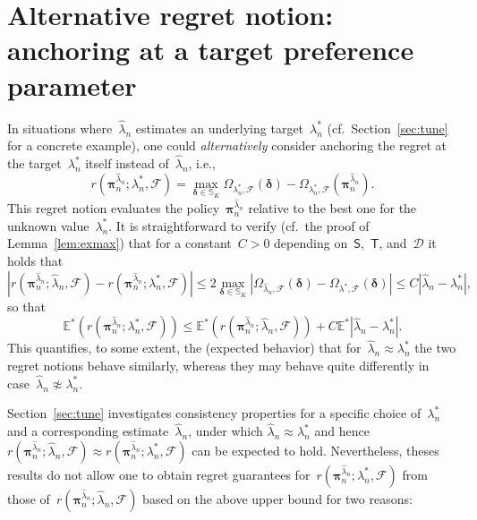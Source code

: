 \documentclass[11pt, a4paper]{article}
\theoremstyle{definition}
\begin{document}
\section{Alternative regret notion: anchoring at a target preference parameter}\label{sec:altreg}

In situations where~$\hat{\lambda}_n$ estimates an underlying target~$\lambda_n^*$ (cf.~Section~\ref{sec:tune} for a concrete example), one could \emph{alternatively} consider anchoring the regret at the target~$\lambda_n^*$ itself instead of~$\hat{\lambda}_n$, i.e., 
%
\begin{equation*}
r(\bm{\pi}^{  \hat{\lambda}_n}_n; \lambda^*_n, \mathcal{F}) = \max_{\bm{\delta} \in \mathbb{S}_K} \Omega_{\lambda^*_n, \mathcal{F}}(\bm{\delta}) - \Omega_{\lambda^*_n, \mathcal{F}} \left(\bm{\pi}^{\hat{\lambda}_n}_n\right).
\end{equation*}
%
This regret notion evaluates the policy~$\bm{\pi}^{\hat{\lambda}_n}_n$ relative to the best one for the unknown value~$\lambda^*_n$. It is straightforward to verify (cf.~the proof of Lemma~\ref{lem:exmax}) that for a constant~$C>0$ depending on~$\mathsf{S}$,~$\mathsf{T}$, and~$\mathscr{D}$ it holds that
\begin{equation*}
\left| r(\bm{\pi}^{  \hat{\lambda}_n}_n; \hat{\lambda}_n, \mathcal{F}) - r(\bm{\pi}^{  \hat{\lambda}_n}_n; \lambda^*_n, \mathcal{F}) \right|
\leq 2 \max_{\bm{\delta} \in \mathbb{S}_K} |\Omega_{\hat{\lambda}_n, \mathcal{F}}(\bm{\delta})-\Omega_{\lambda^*, \mathcal{F}}(\bm{\delta})| \leq C |\hat{\lambda}_n - \lambda^*_n|,
\end{equation*}
%
so that
%
\begin{equation*}
\mathbb{E}^*(r(\bm{\pi}^{  \hat{\lambda}_n}_n; \lambda^*_n, \mathcal{F})) \leq \mathbb{E}^*(r(\bm{\pi}^{  \hat{\lambda}_n}_n; \hat{\lambda}_n, \mathcal{F})) + C \mathbb{E}^*|\hat{\lambda}_n - \lambda^*_n|.
\end{equation*}
%
This quantifies, to some extent, the (expected behavior) that for~$\hat{\lambda}_n \approx \lambda^*_n$ the two regret notions behave similarly, whereas they may behave quite differently in case~$\hat{\lambda}_n \not \approx \lambda^*_n$. 

Section~\ref{sec:tune} investigates consistency properties for a specific choice of~$\lambda^*_n$ and a corresponding estimate~$\hat{\lambda}_n$, under which $\hat{\lambda}_n \approx \lambda^*_n$ and hence~$r(\bm{\pi}^{  \hat{\lambda}_n}_n; \hat{\lambda}_n, \mathcal{F}) \approx r(\bm{\pi}^{  \hat{\lambda}_n}_n; \lambda^*_n, \mathcal{F})$ can be expected to hold. Nevertheless, theses results do not allow one to obtain regret guarantees for~$r(\bm{\pi}^{  \hat{\lambda}_n}_n; \lambda^*_n, \mathcal{F})$ from those of~$r(\bm{\pi}^{  \hat{\lambda}_n}_n; \hat{\lambda}_n, \mathcal{F})$ based on the above upper bound for two reasons: 
\end{document}
